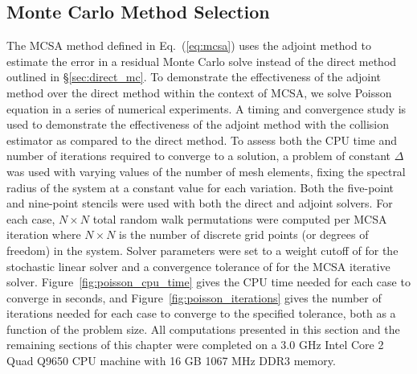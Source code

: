 \subsection{Monte Carlo Method Selection}
\label{sec:mc_method_selection}
The MCSA method defined in Eq.~(\ref{eq:mcsa}) uses the adjoint method
to estimate the error in a residual Monte Carlo solve instead of the
direct method outlined in \S\ref{sec:direct_mc}. To demonstrate the
effectiveness of the adjoint method over the direct method within the
context of MCSA, we solve Poisson equation in a series of numerical
experiments. A timing and convergence study is used to demonstrate
the effectiveness of the adjoint method with the collision estimator
as compared to the direct method. To assess both the CPU time and
number of iterations required to converge to a solution, a problem of
constant $\Delta$ was used with varying values of the number of mesh
elements, fixing the spectral radius of the system at a constant value
for each variation. Both the five-point and nine-point stencils were
used with both the direct and adjoint solvers. For each case, $N
\times N$ total random walk permutations were computed per MCSA
iteration where $N \times N$ is the number of discrete grid points (or
degrees of freedom) in the system. Solver parameters were set to a
weight cutoff of  for the stochastic linear solver and a
convergence tolerance of  for the MCSA iterative solver.
Figure~\ref{fig:poisson_cpu_time} gives the CPU time needed for each
case to converge in seconds, and Figure~\ref{fig:poisson_iterations}
gives the number of iterations needed for each case to converge to the
specified tolerance, both as a function of the problem size. All
computations presented in this section and the remaining sections of
this chapter were completed on a 3.0 GHz Intel Core 2 Quad Q9650 CPU
machine with 16 GB 1067 MHz DDR3 memory.

